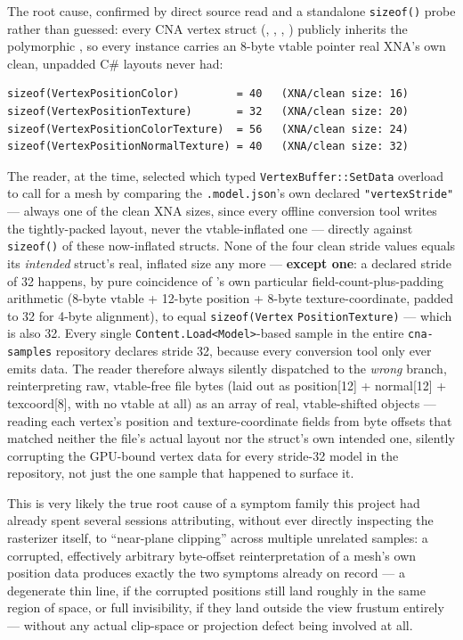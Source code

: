 The root cause, confirmed by direct source read and a standalone \texttt{sizeof()} probe
rather than guessed: every CNA vertex struct
(, ,
, ) publicly
inherits the polymorphic , so every instance carries an 8-byte vtable
pointer real XNA's own clean, unpadded C\# layouts never had:

\begin{lstlisting}
sizeof(VertexPositionColor)         = 40   (XNA/clean size: 16)
sizeof(VertexPositionTexture)       = 32   (XNA/clean size: 20)
sizeof(VertexPositionColorTexture)  = 56   (XNA/clean size: 24)
sizeof(VertexPositionNormalTexture) = 40   (XNA/clean size: 32)
\end{lstlisting}

The reader, at the time, selected which typed \texttt{VertexBuffer::SetData} overload to
call for a mesh by comparing the \texttt{.model.json}'s own declared \texttt{"vertexStride"}
--- always one of the clean XNA sizes, since every offline conversion tool writes the
tightly-packed layout, never the vtable-inflated one --- directly against \texttt{sizeof()}
of these now-inflated structs. None of the four clean stride values equals its
\emph{intended} struct's real, inflated size any more --- \textbf{except one}: a declared
stride of 32 happens, by pure coincidence of 's own
particular field-count-plus-padding arithmetic (8-byte vtable + 12-byte position + 8-byte
texture-coordinate, padded to 32 for 4-byte alignment), to equal \texttt{sizeof(Vertex}\allowbreak{}
\texttt{PositionTexture)} --- which is also 32. Every single \texttt{Content.Load<Model>}-based
sample in the entire \texttt{cna-samples} repository declares stride 32, because every
conversion tool only ever emits  data. The reader
therefore always silently dispatched to the \emph{wrong} branch, reinterpreting raw,
vtable-free file bytes (laid out as position[12] + normal[12] + texcoord[8], with no
vtable at all) as an array of real, vtable-shifted  objects
--- reading each vertex's position and texture-coordinate fields from byte offsets that
matched neither the file's actual layout nor the struct's own intended one, silently
corrupting the GPU-bound vertex data for every stride-32 model in the repository, not just
the one sample that happened to surface it.

This is very likely the true root cause of a symptom family this project had already spent
several sessions attributing, without ever directly inspecting the rasterizer itself, to
``near-plane clipping'' across multiple unrelated samples: a corrupted, effectively
arbitrary byte-offset reinterpretation of a mesh's own position data produces exactly the
two symptoms already on record --- a degenerate thin line, if the corrupted positions still
land roughly in the same region of space, or full invisibility, if they land outside the
view frustum entirely --- without any actual clip-space or projection defect being involved
at all.

